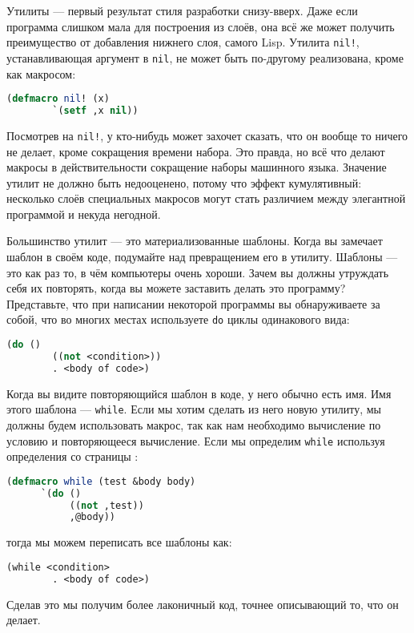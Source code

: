 \documentclass[12pt, a4paper]{article} %
\begin{document}
Утилиты --- первый результат стиля разработки снизу-вверх. Даже если программа слишком мала для построения из слоёв, она всё же может получить преимущество от добавления нижнего слоя, самого Lisp. Утилита \texttt{nil!}, устанавливающая аргумент в \texttt{nil}, не может быть по-другому реализована, кроме как макросом:
\begin{lstlisting}[language=Lisp]
    (defmacro nil! (x)
        `(setf ,x nil))
\end{lstlisting}
Посмотрев на \texttt{nil!}, у кто-нибудь может захочет сказать, что он вообще то ничего не делает, кроме сокращения времени набора. Это правда, но всё что делают макросы в действительности сокращение наборы машинного языка. Значение утилит не должно быть недооценено, потому что эффект кумулятивный: несколько слоёв специальных макросов могут стать различием между элегантной программой и некуда негодной.

Большинство утилит --- это материализованные шаблоны. Когда вы замечает шаблон в своём коде, подумайте над превращением его в утилиту. Шаблоны --- это как раз то, в чём компьютеры очень хороши. Зачем вы должны утруждать себя их повторять, когда вы можете заставить делать это программу? Представьте, что при написании некоторой программы вы обнаруживаете за собой, что во многих местах используете \texttt{do} циклы одинакового вида:
\begin{lstlisting}[language=Lisp]
    (do ()
        ((not <condition>))
        . <body of code>)
\end{lstlisting}
Когда вы видите повторяющийся шаблон в коде, у него обычно есть имя. Имя этого шаблона --- \texttt{while}. Если мы хотим сделать из него новую утилиту, мы должны будем использовать макрос, так как нам необходимо вычисление по условию и повторяющееся вычисление. Если мы определим \texttt{while} используя определения со страницы \pageref{91}:
\begin{lstlisting}[language=Lisp]
    (defmacro while (test &body body)
      `(do ()
           ((not ,test))
           ,@body))
\end{lstlisting}
тогда мы можем переписать все шаблоны как:
\begin{lstlisting}[language=Lisp]
    (while <condition>
        . <body of code>)
\end{lstlisting}
Сделав это мы получим более лаконичный код, точнее описывающий то, что он делает.
\end{document}

